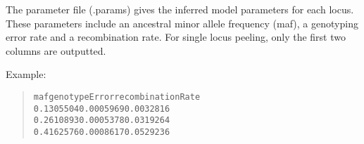 \documentclass[a4paper]{article}
\begin{document}
The parameter file (.params) gives the inferred model parameters for each locus. These parameters include an ancestral minor allele frequency (maf), a genotyping error rate and a recombination rate. For single locus peeling, only the first two columns are outputted.

Example:

\begin{quote}
\begin{alltt}
maf genotypeError recombinationRate
0.1305504   0.0005969   0.0032816
0.2610893   0.0005378   0.0319264
0.4162576   0.0008617   0.0529236
\end{alltt}
\end{quote}
\end{document}
